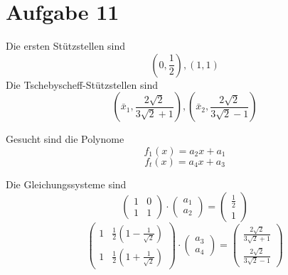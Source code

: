 \documentclass[10pt,a4paper]{article}
\begin{document}
\section{Aufgabe 11}

Die ersten Stützstellen sind
\begin{equation}
  (0, \frac{1}{2}), (1, 1)
\end{equation}
Die Tschebyscheff-Stützstellen sind
\begin{equation}
  (\bar{x}_{1}, \frac{2 \sqrt{2}}{3 \sqrt{2} + 1}), (\bar{x}_{2}, \frac{2 \sqrt{2}}{3 \sqrt{2} - 1})
\end{equation}

Gesucht sind die Polynome
\begin{equation}
  f_{1}(x) = a_{2}x + a_{1}
\end{equation}
\begin{equation}
  f_{t}(x) = a_{4}x + a_{3}
\end{equation}

Die Gleichungssysteme sind
\begin{equation}
  \begin{pmatrix}
    1 & 0\\
    1 & 1
  \end{pmatrix}
  \cdot
  \begin{pmatrix}
    a_{1}\\a_{2}
  \end{pmatrix}
  =
  \begin{pmatrix}
    \frac{1}{2}\\
    1
  \end{pmatrix}
\end{equation}
\begin{equation}
  \begin{pmatrix}
    1 & \frac{1}{2} \left( 1 - \frac{1}{\sqrt{2}} \right)\\
    1 & \frac{1}{2} \left( 1 + \frac{1}{\sqrt{2}} \right)
  \end{pmatrix}
  \cdot
  \begin{pmatrix}
    a_{3}\\a_{4}
  \end{pmatrix}
  =
  \begin{pmatrix}
    \frac{2 \sqrt{2}}{3 \sqrt{2} + 1}\\
    \frac{2 \sqrt{2}}{3 \sqrt{2} - 1}
  \end{pmatrix}
\end{equation}
\end{document}
